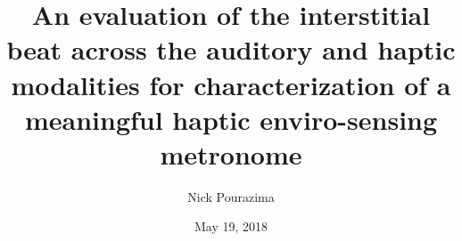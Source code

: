 
\title{\textbf{An evaluation of the interstitial beat across the auditory and haptic modalities for characterization of a meaningful haptic enviro-sensing metronome}\\ \vspace{12pt}}
\author{Nick Pourazima}
\date{May 19, 2018}


